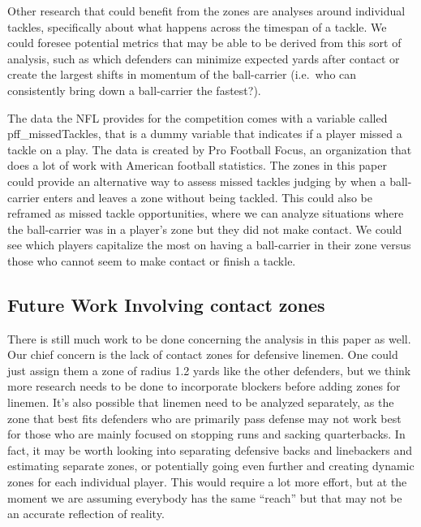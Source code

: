 \documentclass[
  12pt]{article}
\begin{document}
Other research that could benefit from the zones are analyses around
individual tackles, specifically about what happens across the timespan
of a tackle. We could foresee potential metrics that may be able to be
derived from this sort of analysis, such as which defenders can minimize
expected yards after contact or create the largest shifts in momentum of
the ball-carrier (i.e.~who can consistently bring down a ball-carrier
the fastest?).

The data the NFL provides for the competition comes with a variable
called pff\_missedTackles, that is a dummy variable that indicates if a
player missed a tackle on a play. The data is created by Pro Football
Focus, an organization that does a lot of work with American football
statistics. The zones in this paper could provide an alternative way to
assess missed tackles judging by when a ball-carrier enters and leaves a
zone without being tackled. This could also be reframed as missed tackle
opportunities, where we can analyze situations where the ball-carrier
was in a player's zone but they did not make contact. We could see which
players capitalize the most on having a ball-carrier in their zone
versus those who cannot seem to make contact or finish a tackle.

\subsection{Future Work Involving contact
zones}\label{future-work-involving-contact-zones}

There is still much work to be done concerning the analysis in this
paper as well. Our chief concern is the lack of contact zones for
defensive linemen. One could just assign them a zone of radius 1.2 yards
like the other defenders, but we think more research needs to be done to
incorporate blockers before adding zones for linemen. It's also possible
that linemen need to be analyzed separately, as the zone that best fits
defenders who are primarily pass defense may not work best for those who
are mainly focused on stopping runs and sacking quarterbacks. In fact,
it may be worth looking into separating defensive backs and linebackers
and estimating separate zones, or potentially going even further and
creating dynamic zones for each individual player. This would require a
lot more effort, but at the moment we are assuming everybody has the
same ``reach'' but that may not be an accurate reflection of reality.
\end{document}
